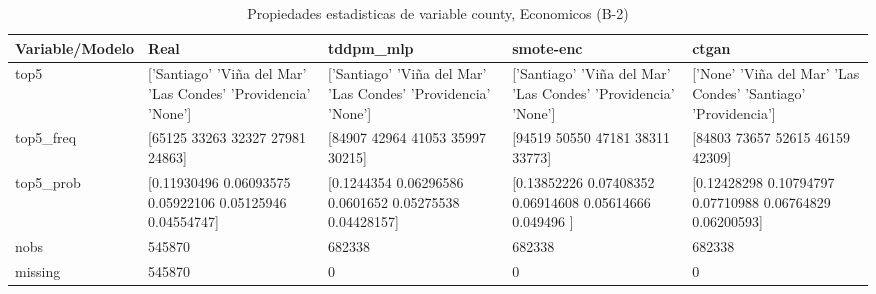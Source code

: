 \begin{table}[H]
\centering
\fontsize{8}{14}\selectfont
\caption{Propiedades  estadisticas de variable county, Economicos (B-2)}
\label{table-stats-economicos-b-2-county}
\begin{tabular}{|l|m{10em}|m{10em}|m{10em}|m{10em}|}
\hline
 \rowcolor[gray]{0.8}
Variable/Modelo & Real & tddpm\_mlp & smote-enc & ctgan \\
\hline top5 & ['Santiago' 'Viña del Mar' 'Las Condes' 'Providencia' 'None'] & ['Santiago' 'Viña del Mar' 'Las Condes' 'Providencia' 'None'] & ['Santiago' 'Viña del Mar' 'Las Condes' 'Providencia' 'None'] & ['None' 'Viña del Mar' 'Las Condes' 'Santiago' 'Providencia'] \\
\hline top5\_freq & [65125 33263 32327 27981 24863] & [84907 42964 41053 35997 30215] & [94519 50550 47181 38311 33773] & [84803 73657 52615 46159 42309] \\
\hline top5\_prob & [0.11930496 0.06093575 0.05922106 0.05125946 0.04554747] & [0.1244354  0.06296586 0.0601652  0.05275538 0.04428157] & [0.13852226 0.07408352 0.06914608 0.05614666 0.049496  ] & [0.12428298 0.10794797 0.07710988 0.06764829 0.06200593] \\
\hline nobs & 545870 & 682338 & 682338 & 682338 \\
\hline missing & 545870 & 0 & 0 & 0 \\
\hline
\end{tabular}
\end{table}
